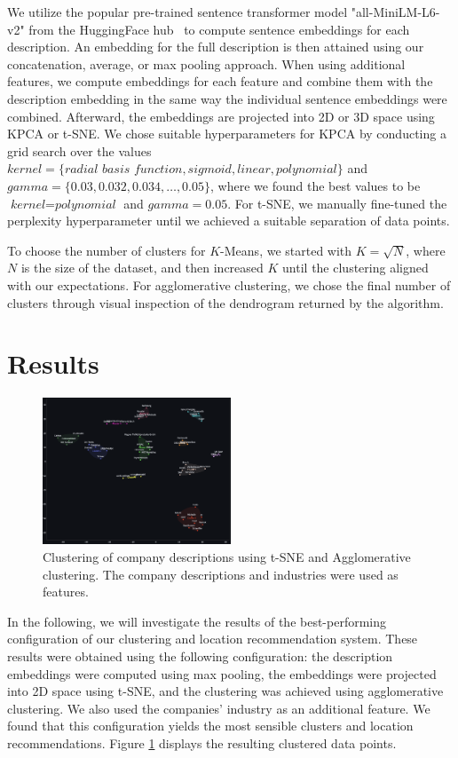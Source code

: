 \documentclass[conference]{IEEEtran}
\begin{document}
We utilize the popular pre-trained sentence transformer model "all-MiniLM-L6-v2" from the HuggingFace hub~\cite{sentence-transformer-model} to compute sentence embeddings for each description. An embedding for the full description is then attained using our concatenation, average, or max pooling approach. When using additional features, we compute embeddings for each feature and combine them with the description embedding in the same way the individual sentence embeddings were combined.
Afterward, the embeddings are projected into 2D or 3D space using KPCA or t-SNE. We chose suitable hyperparameters for KPCA by conducting a grid search over the values $\textit{kernel} = \{\textit{radial basis function}, \textit{sigmoid}, \textit{linear}, \textit{polynomial} \}$ and $\textit{gamma} = \{0.03, 0.032, 0.034, \dots, 0.05\}$, where we found the best values to be $\textit{kernel} = \textit{polynomial}$ and $\textit{gamma} = 0.05$. For t-SNE, we manually fine-tuned the perplexity hyperparameter until we achieved a suitable separation of data points.

To choose the number of clusters for $K$-Means, we started with $K = \sqrt{N}$, where $N$ is the size of the dataset, and then increased $K$ until the clustering aligned with our expectations. For agglomerative clustering, we chose the final number of clusters through visual inspection of the dendrogram returned by the algorithm.

\section{Results}
\begin{figure}[H]
	\centering
	\includegraphics[width=0.5\textwidth]{figures/clustering_results.png}
	\caption{Clustering of company descriptions using t-SNE and Agglomerative clustering. The company descriptions and industries were used as features.}
	\label{fig:t-sne-agglomerative}
\end{figure}

In the following, we will investigate the results of the best-performing configuration of our clustering and location recommendation system. These results were obtained using the following configuration: the description embeddings were computed using max pooling, the embeddings were projected into 2D space using t-SNE, and the clustering was achieved using agglomerative clustering. We also used the companies' industry as an additional feature.
We found that this configuration yields the most sensible clusters and location recommendations. Figure \ref{fig:t-sne-agglomerative} displays the resulting clustered data points.
\end{document}
